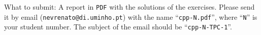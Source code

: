 \documentclass[a4paper, 11pt]{article}
\theoremstyle{definition}
\theoremstyle{sub}
\begin{document}
\begin{mdframed}
  What to submit: A report in \texttt{PDF} with the solutions of the exercises.
  Please send it by email (\texttt{nevrenato@di.uminho.pt}) with the name
  ``\texttt{cpp-N.pdf}'', where ``\texttt{N}'' is your student number.  The
  subject of the email should be ``\texttt{cpp-N-TPC-1}''.
\end{mdframed}





\end{document}
